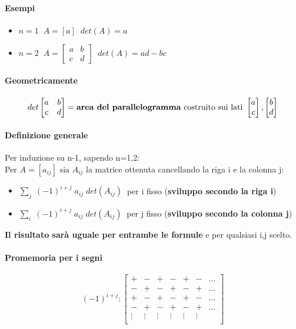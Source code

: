 \documentclass[a4paper, 12pt]{report}
\begin{document}
    \paragraph{Esempi}
    \begin{itemize}
        \item $n=1 \;\; A=[a] \;\; det(A)=a$
        \item $n=2 \;\; A=
        \begin{bmatrix}
            a & b\\
            c & d
        \end{bmatrix}
        \;\; det(A)=ad- bc$
    \end{itemize}
    \paragraph{Geometricamente} 
    $$
    det
    \begin{bmatrix}
        a & b\\
        c & d
    \end{bmatrix}
    = \text{\textbf{area del parallelogramma} costruito sui lati }
    \begin{bmatrix}
        a\\
        c
    \end{bmatrix}
    ,
    \begin{bmatrix}
        b\\
        d
    \end{bmatrix}
    $$
    \paragraph{Definizione generale} Per induzione su n-1, sapendo n=1,2:\\
    Per $A=[a_{ij}] \text{ sia } A_{ij}$ la matrice ottenuta cancellando la riga i e la colonna j:
        \begin{itemize}
            \item $\sum_{j} \; (-1)^{i+j} \; a_{ij} \; det(A_{ij}) \; \;$per i fisso (\textbf{sviluppo secondo la riga i})
            \item $\sum_{i} \; (-1)^{i+j} \; a_{ij} \; det(A_{ij}) \; \;$per j fisso (\textbf{sviluppo secondo la colonna j})
        \end{itemize}
    \textbf{Il risultato sarà uguale per entrambe le formule} e per qualsiasi i,j scelto.
    \paragraph{Promemoria per i segni}
    $$
    (-1)^{i+j}:
    \begin{bmatrix}
        + & - & + & - & + & - & \dots\\
        - & + & - & + & - & + & \dots\\
        + & - & + & - & + & - & \dots\\
        - & + & - & + & - & + & \dots\\
        \vdots & \vdots & \vdots & \vdots & \vdots & \vdots \\
    \end{bmatrix}
    $$
\end{document}
